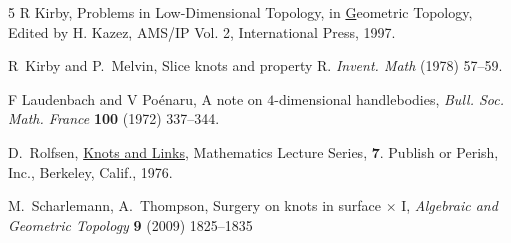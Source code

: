 \documentclass{amsart}
\begin{document}
\begin{thebibliography}{5}
 R Kirby, Problems in Low-Dimensional Topology, in {\underline Geometric Topology}, Edited by H. Kazez, AMS/IP Vol. 2, International Press, 1997.

 R~Kirby and P.~Melvin, Slice knots and property R.
{\em Invent. Math} (1978) 57--59.

 F Laudenbach and V Po\'enaru, A note on $4$-dimensional handlebodies, {\em Bull. Soc. Math. France} {\bf 100} (1972) 337--344.



 D.~Rolfsen, \underline{Knots and Links}, Mathematics Lecture Series, {\bf 7}. Publish or Perish, Inc., Berkeley, Calif., 1976.

  M.~Scharlemann, A.~Thompson, Surgery on knots in surface $\times$ I, {\em Algebraic and Geometric Topology} {\bf 9} (2009) 1825--1835


\end{thebibliography}
\end{document}
